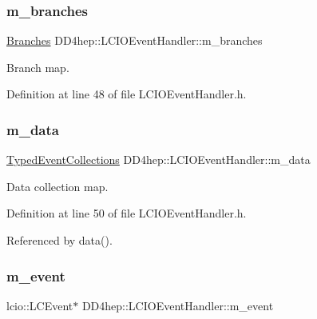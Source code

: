 \subsubsection{\texorpdfstring{m\+\_\+branches}{m\_branches}}
{\footnotesize\ttfamily \hyperlink{class_d_d4hep_1_1_l_c_i_o_event_handler_abb97052600fb229e9fdc6cfeefdc4177}{Branches} D\+D4hep\+::\+L\+C\+I\+O\+Event\+Handler\+::m\+\_\+branches\hspace{0.3cm}{\ttfamily [protected]}}



Branch map. 



Definition at line 48 of file L\+C\+I\+O\+Event\+Handler.\+h.

\hypertarget{class_d_d4hep_1_1_l_c_i_o_event_handler_aad03bcadad9458ec37c9e13209481595}{}\label{class_d_d4hep_1_1_l_c_i_o_event_handler_aad03bcadad9458ec37c9e13209481595} 
\subsubsection{\texorpdfstring{m\+\_\+data}{m\_data}}
{\footnotesize\ttfamily \hyperlink{class_d_d4hep_1_1_event_handler_a4d441ff8a824b1e2f278e8b7a6391af3}{Typed\+Event\+Collections} D\+D4hep\+::\+L\+C\+I\+O\+Event\+Handler\+::m\+\_\+data\hspace{0.3cm}{\ttfamily [protected]}}



Data collection map. 



Definition at line 50 of file L\+C\+I\+O\+Event\+Handler.\+h.



Referenced by data().

\hypertarget{class_d_d4hep_1_1_l_c_i_o_event_handler_a8ec477793e0d557bb46f65953c9366d2}{}\label{class_d_d4hep_1_1_l_c_i_o_event_handler_a8ec477793e0d557bb46f65953c9366d2} 
\subsubsection{\texorpdfstring{m\+\_\+event}{m\_event}}
{\footnotesize\ttfamily lcio\+::\+L\+C\+Event$\ast$ D\+D4hep\+::\+L\+C\+I\+O\+Event\+Handler\+::m\+\_\+event\hspace{0.3cm}{\ttfamily [protected]}}



